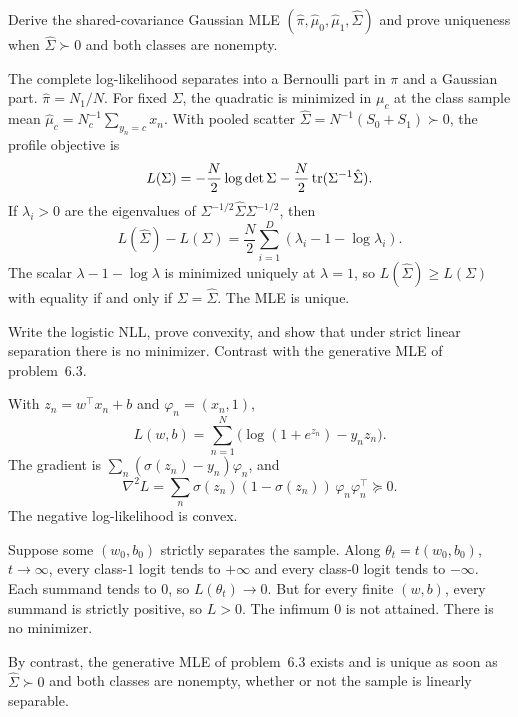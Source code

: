 \begin{hwqbox}
Derive the shared-covariance Gaussian MLE $(\hat\pi,\hat\mu_0,\hat\mu_1,\hat\Sigma)$ and prove uniqueness when $\hat\Sigma\succ 0$ and both classes are nonempty.
\end{hwqbox}
\begin{hwsolbox}
The complete log-likelihood separates into a Bernoulli part in $\pi$ and a Gaussian part. $\hat\pi=N_1/N$. For fixed $\Sigma$, the quadratic is minimized in $\mu_c$ at the class sample mean $\hat\mu_c=N_c^{-1}\sum_{y_n=c}x_n$. With pooled scatter $\hat\Sigma=N^{-1}(S_0+S_1)\succ 0$, the profile objective is
\[
L(\Sigma)=-\frac N2\log\det\Sigma-\frac N2\operatorname{tr}(\Sigma^{-1}\hat\Sigma).
\]
If $\lambda_i>0$ are the eigenvalues of $\Sigma^{-1/2}\hat\Sigma\Sigma^{-1/2}$, then
\[
L(\hat\Sigma)-L(\Sigma)=\frac N2\sum_{i=1}^D(\lambda_i-1-\log\lambda_i).
\]
The scalar $\lambda-1-\log\lambda$ is minimized uniquely at $\lambda=1$, so $L(\hat\Sigma)\ge L(\Sigma)$ with equality if and only if $\Sigma=\hat\Sigma$. The MLE is unique.
\end{hwsolbox}

\begin{hwqbox}
Write the logistic NLL, prove convexity, and show that under strict linear separation there is no minimizer. Contrast with the generative MLE of problem~6.3.
\end{hwqbox}
\begin{hwsolbox}
With $z_n=w^\top x_n+b$ and $\varphi_n=(x_n,1)$,
\[
L(w,b)=\sum_{n=1}^N\big(\log(1+e^{z_n})-y_n z_n\big).
\]
The gradient is $\sum_n(\sigma(z_n)-y_n)\varphi_n$, and
\[
\nabla^2 L=\sum_n\sigma(z_n)(1-\sigma(z_n))\,\varphi_n\varphi_n^\top\succeq 0.
\]
The negative log-likelihood is convex.

Suppose some $(w_0,b_0)$ strictly separates the sample. Along $\theta_t=t(w_0,b_0)$, $t\to\infty$, every class-$1$ logit tends to $+\infty$ and every class-$0$ logit tends to $-\infty$. Each summand tends to $0$, so $L(\theta_t)\to 0$. But for every finite $(w,b)$, every summand is strictly positive, so $L>0$. The infimum $0$ is not attained. There is no minimizer.

By contrast, the generative MLE of problem~6.3 exists and is unique as soon as $\hat\Sigma\succ 0$ and both classes are nonempty, whether or not the sample is linearly separable.
\end{hwsolbox}

